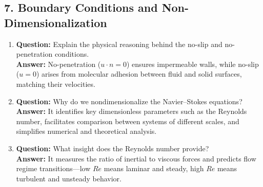 \documentclass[12pt]{article}
\begin{document}
\subsection*{7. Boundary Conditions and Non-Dimensionalization}
\begin{enumerate}
\item \textbf{Question:} Explain the physical reasoning behind the no-slip and no-penetration conditions.\\
\textbf{Answer:} No-penetration ($u \cdot n=0$) ensures impermeable walls, while no-slip ($u=0$) arises from molecular adhesion between fluid and solid surfaces, matching their velocities.

\item \textbf{Question:} Why do we nondimensionalize the Navier--Stokes equations?\\
\textbf{Answer:} It identifies key dimensionless parameters such as the Reynolds number, facilitates comparison between systems of different scales, and simplifies numerical and theoretical analysis.

\item \textbf{Question:} What insight does the Reynolds number provide?\\
\textbf{Answer:} It measures the ratio of inertial to viscous forces and predicts flow regime transitions—low $Re$ means laminar and steady, high $Re$ means turbulent and unsteady behavior.
\end{enumerate}
\end{document}
